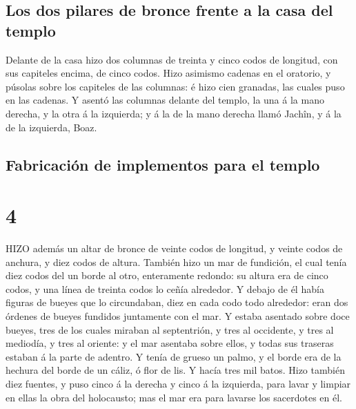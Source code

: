 \hypertarget{los-dos-pilares-de-bronce-frente-a-la-casa-del-templo}{%
\subsection{Los dos pilares de bronce frente a la casa del
templo}\label{los-dos-pilares-de-bronce-frente-a-la-casa-del-templo}}

 Delante de la casa hizo dos columnas de treinta y cinco
codos de longitud, con sus capiteles encima, de cinco codos.
 Hizo asimismo cadenas en el oratorio, y púsolas sobre los
capiteles de las columnas: é hizo cien granadas, las cuales puso en las
cadenas.  Y asentó las columnas delante del templo, la una
á la mano derecha, y la otra á la izquierda; y á la de la mano derecha
llamó Jachîn, y á la de la izquierda, Boaz.

\hypertarget{fabricaciuxf3n-de-implementos-para-el-templo}{%
\subsection{Fabricación de implementos para el
templo}\label{fabricaciuxf3n-de-implementos-para-el-templo}}

\hypertarget{section-3}{%
\section{4}\label{section-3}}

 HIZO además un altar de bronce de veinte codos de longitud,
y veinte codos de anchura, y diez codos de altura.  También
hizo un mar de fundición, el cual tenía diez codos del un borde al otro,
enteramente redondo: su altura era de cinco codos, y una línea de
treinta codos lo ceñía alrededor.  Y debajo de él había
figuras de bueyes que lo circundaban, diez en cada codo todo alrededor:
eran dos órdenes de bueyes fundidos juntamente con el mar. 
Y estaba asentado sobre doce bueyes, tres de los cuales miraban al
septentrión, y tres al occidente, y tres al mediodía, y tres al oriente:
y el mar asentaba sobre ellos, y todas sus traseras estaban á la parte
de adentro.  Y tenía de grueso un palmo, y el borde era de
la hechura del borde de un cáliz, ó flor de lis. Y hacía tres mil batos.
 Hizo también diez fuentes, y puso cinco á la derecha y
cinco á la izquierda, para lavar y limpiar en ellas la obra del
holocausto; mas el mar era para lavarse los sacerdotes en él.

